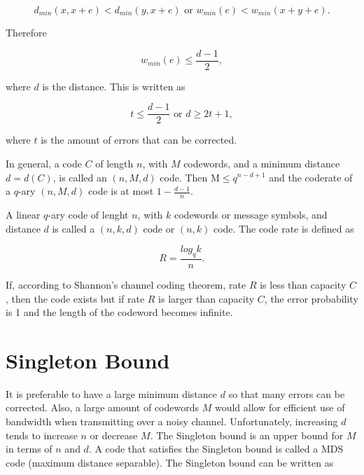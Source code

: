 \documentclass[../main.tex]{subfiles}
\begin{document}
    \begin{equation*}
        d_{min}(x, x+e) < d_{min}(y, x+e) \text{ or } w_{min}(e) < w_{min}(x+y+e).
    \end{equation*}

    \noindent
    Therefore

    \begin{equation*}
         w_{min}(e) \leq \frac{d-1}{2},
    \end{equation*}

    \noindent
    where $d$ is the distance. This is written as

    \begin{equation*}
        t \leq \frac{d-1}{2} \text{ or } d \geq 2t+1,
    \end{equation*}

    \noindent
    where $t$ is the amount of errors that can be corrected.

    In general, a code $C$ of length $n$, with $M$ codewords, and a minimum distance $d=d(C)$, is called an $(n,M,d)$ code. Then M$ \leq q^{n-d+1}$ and the coderate of a $q$-ary $(n,M,d)$ code is at most $1-\frac{d-1}{n}$.

    A linear $q$-ary code of lenght $n$, with $k$ codewords or message symbols, and distance $d$ is called a $(n,k,d)$ code or $(n,k)$ code. The code rate is defined as

    \begin{equation*}
        R=\frac{log_qk}{n}.
    \end{equation*}

    \noindent
    If, according to Shannon's channel coding theorem, rate $R$ is less than capacity $C$, then the code exists but if rate $R$ is larger than capacity $C$, the error probability is 1 and the length of the codeword becomes infinite.


    \section{Singleton Bound}
    It is preferable to have a large minimum distance $d$ so that many errors can be corrected. Also, a large amount of codewords $M$ would allow for efficient use of bandwidth when transmitting over a noisy channel. Unfortunately, increasing $d$ tends to increase $n$ or decrease $M$. The Singleton bound is an upper bound for $M$ in terms of $n$ and $d$. A code that satisfies the Singleton bound is called a MDS code (maximum distance separable). The Singleton bound can be written as
\end{document}
